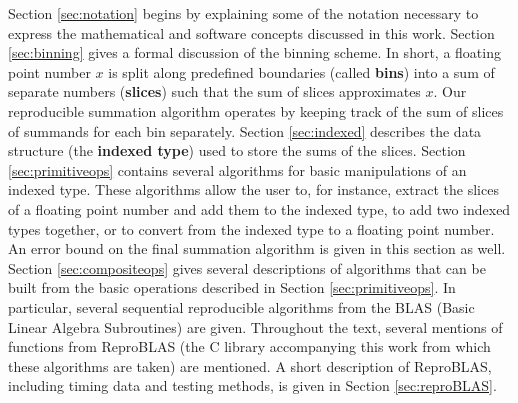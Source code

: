   Section \ref{sec:notation} begins by explaining some of the notation necessary to express the mathematical and software concepts discussed in this work.
  Section \ref{sec:binning} gives a formal discussion of the binning scheme. In short, a floating point number $x$ is split along predefined boundaries (called \textbf{bins}) into a sum of separate numbers (\textbf{slices}) such that the sum of slices approximates $x$. Our reproducible summation algorithm operates by keeping track of the sum of slices of summands for each bin separately.
  Section \ref{sec:indexed} describes the data structure (the \textbf{indexed type}) used to store the sums of the slices. 
  Section \ref{sec:primitiveops} contains several algorithms for basic manipulations of an indexed type. These algorithms allow the user to, for instance, extract the slices of a floating point number and add them to the indexed type, to add two indexed types together, or to convert from the indexed type to a floating point number. An error bound on the final summation algorithm is given in this section as well.
  Section \ref{sec:compositeops} gives several descriptions of algorithms that can be built from the basic operations described in Section \ref{sec:primitiveops}. In particular, several sequential reproducible algorithms from the BLAS (Basic Linear Algebra Subroutines) are given.
  Throughout the text, several mentions of functions from ReproBLAS (the C library accompanying this work from which these algorithms are taken) are mentioned. A short description of ReproBLAS, including timing data and testing methods, is given in Section \ref{sec:reproBLAS}.
